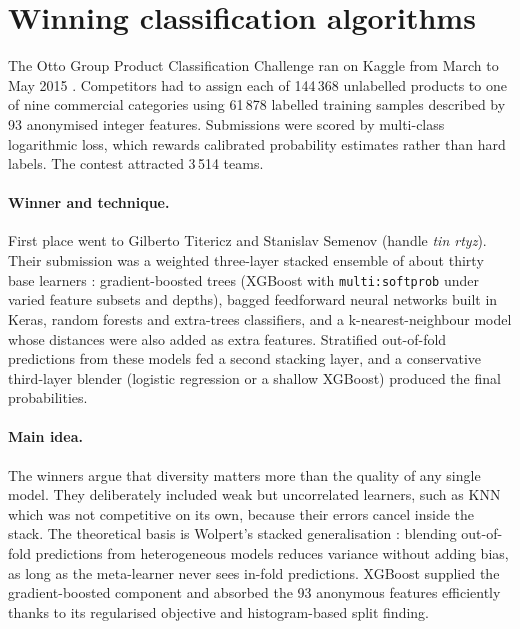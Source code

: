
\section{Winning classification algorithms}\label{sec:winning-classification}

The Otto Group Product Classification Challenge ran on Kaggle from March to May 2015 \cite{kaggle2015otto}. Competitors had to assign each of 144\,368 unlabelled products to one of nine commercial categories using 61\,878 labelled training samples described by 93 anonymised integer features. Submissions were scored by multi-class logarithmic loss, which rewards calibrated probability estimates rather than hard labels. The contest attracted 3\,514 teams.

\paragraph{Winner and technique.} First place went to Gilberto Titericz and Stanislav Semenov (handle \textit{tin rtyz}). Their submission was a weighted three-layer stacked ensemble of about thirty base learners \cite{otto2015writeup}: gradient-boosted trees (XGBoost with \texttt{multi:softprob} under varied feature subsets and depths), bagged feedforward neural networks built in Keras, random forests and extra-trees classifiers, and a k-nearest-neighbour model whose distances were also added as extra features. Stratified out-of-fold predictions from these models fed a second stacking layer, and a conservative third-layer blender (logistic regression or a shallow XGBoost) produced the final probabilities.

\paragraph{Main idea.} The winners argue that diversity matters more than the quality of any single model. They deliberately included weak but uncorrelated learners, such as KNN which was not competitive on its own, because their errors cancel inside the stack. The theoretical basis is Wolpert's stacked generalisation \cite{wolpert1992stacked}: blending out-of-fold predictions from heterogeneous models reduces variance without adding bias, as long as the meta-learner never sees in-fold predictions. XGBoost \cite{chen2016xgboost} supplied the gradient-boosted component and absorbed the 93 anonymous features efficiently thanks to its regularised objective and histogram-based split finding.

